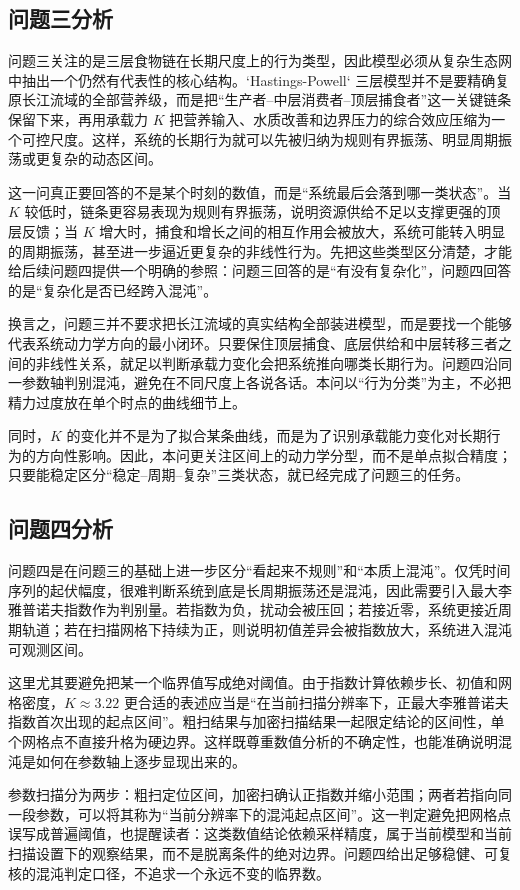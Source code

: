 \subsection{问题三分析}
问题三关注的是三层食物链在长期尺度上的行为类型，因此模型必须从复杂生态网中抽出一个仍然有代表性的核心结构。`Hastings-Powell` 三层模型并不是要精确复原长江流域的全部营养级，而是把“生产者--中层消费者--顶层捕食者”这一关键链条保留下来，再用承载力 \(K\) 把营养输入、水质改善和边界压力的综合效应压缩为一个可控尺度。这样，系统的长期行为就可以先被归纳为规则有界振荡、明显周期振荡或更复杂的动态区间。

这一问真正要回答的不是某个时刻的数值，而是“系统最后会落到哪一类状态”。当 \(K\) 较低时，链条更容易表现为规则有界振荡，说明资源供给不足以支撑更强的顶层反馈；当 \(K\) 增大时，捕食和增长之间的相互作用会被放大，系统可能转入明显的周期振荡，甚至进一步逼近更复杂的非线性行为。先把这些类型区分清楚，才能给后续问题四提供一个明确的参照：问题三回答的是“有没有复杂化”，问题四回答的是“复杂化是否已经跨入混沌”。

换言之，问题三并不要求把长江流域的真实结构全部装进模型，而是要找一个能够代表系统动力学方向的最小闭环。只要保住顶层捕食、底层供给和中层转移三者之间的非线性关系，就足以判断承载力变化会把系统推向哪类长期行为。问题四沿同一参数轴判别混沌，避免在不同尺度上各说各话。本问以“行为分类”为主，不必把精力过度放在单个时点的曲线细节上。

同时，\(K\) 的变化并不是为了拟合某条曲线，而是为了识别承载能力变化对长期行为的方向性影响。因此，本问更关注区间上的动力学分型，而不是单点拟合精度；只要能稳定区分“稳定--周期--复杂”三类状态，就已经完成了问题三的任务。

\subsection{问题四分析}
问题四是在问题三的基础上进一步区分“看起来不规则”和“本质上混沌”。仅凭时间序列的起伏幅度，很难判断系统到底是长周期振荡还是混沌，因此需要引入最大李雅普诺夫指数作为判别量。若指数为负，扰动会被压回；若接近零，系统更接近周期轨道；若在扫描网格下持续为正，则说明初值差异会被指数放大，系统进入混沌可观测区间。

这里尤其要避免把某一个临界值写成绝对阈值。由于指数计算依赖步长、初值和网格密度，\(K\approx 3.22\) 更合适的表述应当是“在当前扫描分辨率下，正最大李雅普诺夫指数首次出现的起点区间”。粗扫结果与加密扫描结果一起限定结论的区间性，单个网格点不直接升格为硬边界。这样既尊重数值分析的不确定性，也能准确说明混沌是如何在参数轴上逐步显现出来的。

参数扫描分为两步：粗扫定位区间，加密扫确认正指数并缩小范围；两者若指向同一段参数，可以将其称为“当前分辨率下的混沌起点区间”。这一判定避免把网格点误写成普遍阈值，也提醒读者：这类数值结论依赖采样精度，属于当前模型和当前扫描设置下的观察结果，而不是脱离条件的绝对边界。问题四给出足够稳健、可复核的混沌判定口径，不追求一个永远不变的临界数。




